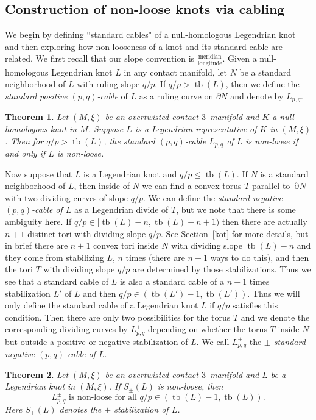 \documentclass[11pt]{amsart}
\theoremstyle{plain}
\newtheorem{theorem}{Theorem}
\theoremstyle{definition}
\theoremstyle{remark}
\numberwithin{theorem}{section}
\newcommand{\dfn}[1]{{\em #1}}        %
\DeclareMathOperator{\bd}{\partial}   %
\DeclareMathOperator\tb{tb}                   %
\begin{document}
\subsection{Construction of non-loose knots via cabling} \label{sec:construction}
We begin by defining ``standard cables" of a null-homologous Legendrian knot and then exploring how non-looseness of a knot and its standard cable are related. We first recall that our slope convention is $\frac{\text{meridian}}{\text{longitude}}$. Given a null-homologous Legendrian knot $L$ in any contact manifold, let $N$ be a standard neighborhood of $L$ with ruling slope $q/p$. If $q/p > \tb(L)$, then we define the \dfn{standard positive $(p,q)$-cable} of $L$ as a ruling curve on $\partial N$ and denote by $L_{p,q}$.  
\begin{theorem}\label{thm:poscable}
  Let $(M,\xi)$ be an overtwisted contact $3$--manifold and $K$ a null-homologous knot in $M$. Suppose $L$ is a Legendrian representative of $K$ in $(M,\xi)$. Then for $q/p > \tb(L)$, the standard $(p,q)$-cable $L_{p,q}$ of $L$ is non-loose if and only if $L$ is non-loose.
  
\end{theorem}

Now suppose that $L$ is a Legendrian knot and $q/p \leq \tb(L)$. If $N$ is a standard neighborhood of $L$, then inside of $N$ we can find a convex torus $T$ parallel to $\bd N$ with two dividing curves of slope $q/p$. We can define the \dfn{standard negative $(p,q)$-cable of $L$} as a Legendrian divide of $T$, but we note that there is some ambiguity here. If $q/p\in[\tb(L)-n, \tb(L)-n+1)$ then there are actually $n+1$ distinct tori with dividing slope $q/p$. See Section~\ref{kot} for more details, but in brief there are $n+1$ convex tori inside $N$ with dividing slope $\tb(L)-n$ and they come from stabilizing $L$, $n$ times (there are $n+1$ ways to do this), and then the tori $T$ with dividing slope $q/p$ are determined by those stabilizations. Thus we see that a standard cable of $L$ is also a standard cable of a $n-1$ times stabilization $L'$ of $L$ and then $q/p\in(\tb(L')-1,\tb(L'))$. Thus we will only define the standard cable of a Legendrian knot $L$ if $q/p$ satisfies this condition. Then there are only two possibilities for the torus $T$ and we denote the corresponding dividing curves by $L_{p,q}^\pm$ depending on whether the torus $T$ inside $N$ but outside a positive or negative stabilization of $L$. We call $L_{p,q}^\pm$ the \dfn{$\pm$ standard negative $(p,q)$-cable of $L$}. 
\begin{theorem}\label{thm:negcable} 
  Let $(M,\xi)$ be an overtwisted contact $3$--manifold and $L$ be a Legendrian knot in $(M,\xi)$. 
  If  $S_\pm(L)$ is non-loose, then 
  \[
 \text{$L_{p,q}^\pm$ is non-loose for all $q/p\in (\tb(L)-1,\tb(L))$.}
  \]
  Here $S_\pm(L)$ denotes the $\pm$ stabilization of $L$.
  \end{theorem}
\end{document}
